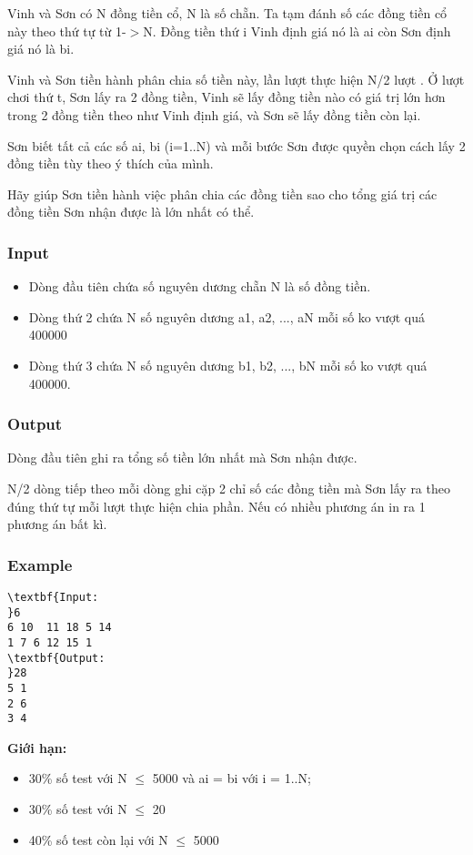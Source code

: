 

Vinh và Sơn có N đồng tiền cổ, N là số chẵn. Ta tạm đánh số các đồng tiền cổ này theo thứ tự từ 1-$>$N. Đồng tiền thứ i Vinh định giá nó là ai còn Sơn định giá nó là bi.

Vinh và Sơn tiền hành phân chia số tiền này, lần lượt thực hiện N/2 lượt . Ở lượt chơi thứ t, Sơn lấy ra 2 đồng tiền, Vinh sẽ lấy đồng tiền nào có giá trị lớn hơn trong 2 đồng tiền theo như Vinh định giá, và Sơn sẽ lấy đồng tiền còn lại.

Sơn biết tất cả các số ai, bi (i=1..N) và mỗi bước Sơn được quyền chọn cách lấy 2 đồng tiền tùy theo ý thích của mình.

Hãy giúp Sơn tiền hành việc phân chia các đồng tiền sao cho tổng giá trị các đồng tiền Sơn nhận được là lớn nhất có thể.

\subsubsection{Input}
\begin{itemize}
	\item Dòng đầu tiên chứa số nguyên dương chẵn N là số đồng tiền.
	\item Dòng thứ 2 chứa N số nguyên dương a1, a2, ..., aN mỗi số ko vượt quá 400000
	\item Dòng thứ 3 chứa N số nguyên dương b1, b2, ..., bN mỗi số ko vượt quá 400000.
\end{itemize}

\subsubsection{Output}

Dòng đầu tiên ghi ra tổng số tiền lớn nhất mà Sơn nhận được.

N/2 dòng tiếp theo mỗi dòng ghi cặp 2 chỉ số các đồng tiền mà Sơn lấy ra theo đúng thứ tự mỗi lượt thực hiện chia phần. Nếu có nhiều phương án in ra 1 phương án bất kì.

\subsubsection{Example}
\begin{verbatim}
\textbf{Input:
}6
6 10  11 18 5 14
1 7 6 12 15 1
\textbf{Output:
}28
5 1
2 6
3 4
\end{verbatim}

\textbf{Giới hạn:}
\begin{itemize}
	\item 30\% số test với N  $\le$  5000 và ai = bi với i = 1..N;
	\item 30\% số test với N  $\le$  20
	\item 40\% số test còn lại với N  $\le$  5000 
\end{itemize}
